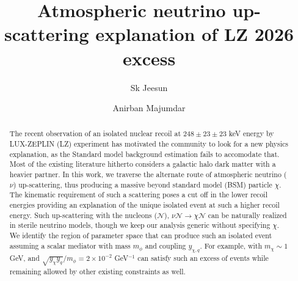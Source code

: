 \documentclass[prd,10pt,twocolumn,nofootinbib,preprint,superscriptaddress]{revtex4}
\newcommand{\nuc}{\mathcal{N}}
\begin{document}
\title{Atmospheric neutrino up-scattering explanation of LZ 2026 excess }

\author{Sk Jeesun\orcidA}
\author{Anirban Majumdar\orcidB}


\begin{abstract}
The recent observation of an isolated nuclear recoil at $248\pm 23\pm 23$ keV energy by LUX-ZEPLIN (LZ) experiment has motivated the community to look for a new physics explanation, as the Standard model background estimation fails to accomodate that.
Most of the existing literature hitherto considers a galactic halo dark matter with a heavier partner. 
In this work, we traverse the alternate route of atmospheric neutrino ($\nu$) up-scattering, thus producing a massive beyond standard model (BSM) particle $\chi$.
The kinematic requirement of such a scattering poses a cut off in the lower recoil energies providing an explanation of the unique isolated event at such a higher recoil energy.
Such up-scattering with the nucleons ($\nuc$), $\nu \nuc\to \chi \nuc$ can be naturally realized in sterile neutrino models, though we keep our analysis generic without specifying $\chi$.
We identify the region of parameter space that can produce such an isolated event 
assuming a scalar mediator with mass $m_\phi$ and coupling $y_{\chi,q}$.
For example, with $m_\chi\sim1$ GeV, and $\sqrt{y_\chi y_q}/m_\phi=2 \times 10^{-2}$ GeV$^{-1}$ can satisfy such an excess of events while remaining allowed by other existing constraints as well.
\end{abstract}

\maketitle
\end{document}
